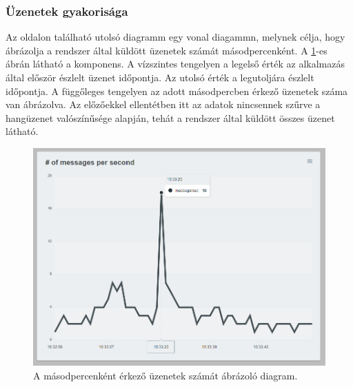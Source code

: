 \subsubsection{Üzenetek gyakorisága}
Az oldalon található utolsó diagramm egy vonal diagammn, melynek célja, hogy ábrázolja a rendszer által küldött üzenetek számát másodpercenként.
A \ref{fig:dashboard-messages-line}-es ábrán látható a komponens.
A vízszintes tengelyen a legelső érték az alkalmazás által először észlelt üzenet időpontja.
Az utolsó érték a legutoljára észlelt időpontja.
A függőleges tengelyen az adott másodpercben érkező üzenetek száma van ábrázolva.
Az előzőekkel ellentétben itt az adatok nincsennek szűrve a hangüzenet valószínűsége alapján,
tehát a rendszer által küldött összes üzenet látható.
\begin{figure}[!ht]
    \centering
    \includegraphics[width=150mm, keepaspectratio]{figures/dashboard-line-messages.png}
    \caption{A másodpercenként érkező üzenetek számát ábrázoló diagram.}
    \label{fig:dashboard-messages-line}
\end{figure}
\newpage
